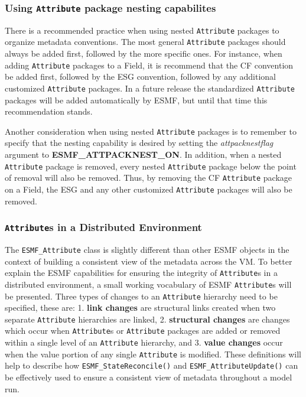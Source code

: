 \subsubsection{Using {\tt Attribute} package nesting capabilites}

There is a recommended practice when using nested {\tt Attribute} packages to organize metadata conventions.  The most general {\tt Attribute} packages should always be added first, followed by the more specific ones.  For instance, when adding {\tt Attribute} packages to a Field, it is recommend that the CF convention be added first, followed by the ESG convention, followed by any additional customized {\tt Attribute} packages.  In a future release the standardized {\tt Attribute} packages will be added automatically by ESMF, but until that time this recommendation stands.

Another consideration when using nested {\tt Attribute} packages is to remember to specify that the nesting capability is desired by setting the {\it attpacknestflag} argument to {\bf ESMF\_ATTPACKNEST\_ON}.  In addition, when a nested {\tt Attribute} package is removed, every nested {\tt Attribute} package below the point of removal will also be removed.  Thus, by removing the CF {\tt Attribute} package on a Field, the ESG and any other customized {\tt Attribute} packages will also be removed.

\subsubsection{{\tt Attribute}s in a Distributed Environment}
\label{sec:Att:Dist}

The  {\tt ESMF\_Attribute} class is slightly different than other ESMF objects in the context of building a consistent view of the metadata across the VM.  To better explain the ESMF capabilities for ensuring the integrity of {\tt Attribute}s in a distributed environment, a small working vocabulary of ESMF {\tt Attribute}s will be presented.  Three types of changes to an {\tt Attribute} hierarchy need to be specified, these are: 1. {\bf link changes} are structural links created when two separate {\tt Attribute} hierarchies are linked, 2. {\bf structural changes} are changes which occur when {\tt Attribute}s or {\tt Attribute} packages are added or removed within a single level of an {\tt Attribute} hierarchy, and 3. {\bf value changes} occur when the value portion of any single {\tt Attribute} is modified.  These definitions will help to describe how {\tt ESMF\_StateReconcile()} and {\tt ESMF\_AttributeUpdate()} can be effectively used to ensure a consistent view of metadata throughout a model run.

